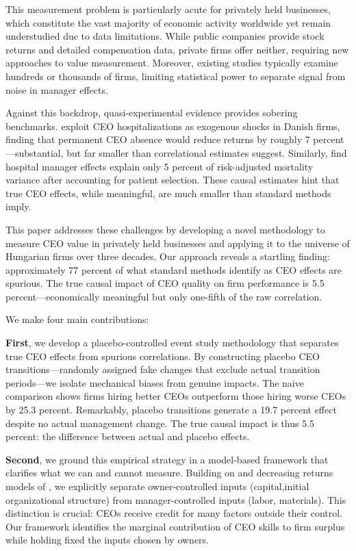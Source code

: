 \documentclass[11pt,a4paper]{article}
\begin{document}
This measurement problem is particularly acute for privately held businesses, which constitute the vast majority of economic activity worldwide yet remain understudied due to data limitations. While public companies provide stock returns and detailed compensation data, private firms offer neither, requiring new approaches to value measurement. Moreover, existing studies typically examine hundreds or thousands of firms, limiting statistical power to separate signal from noise in manager effects.

Against this backdrop, quasi-experimental evidence provides sobering benchmarks. \citet{bennedsen2020ceos} exploit CEO hospitalizations as exogenous shocks in Danish firms, finding that permanent CEO absence would reduce returns by roughly 7 percent---substantial, but far smaller than correlational estimates suggest. Similarly, \citet{chandra2016health} find hospital manager effects explain only 5 percent of risk-adjusted mortality variance after accounting for patient selection. These causal estimates hint that true CEO effects, while meaningful, are much smaller than standard methods imply.

This paper addresses these challenges by developing a novel methodology to measure CEO value in privately held businesses and applying it to the universe of Hungarian firms over three decades. Our approach reveals a startling finding: approximately 77 percent of what standard methods identify as CEO effects are spurious. The true causal impact of CEO quality on firm performance is 5.5 percent---economically meaningful but only one-fifth of the raw correlation.

We make four main contributions:

\textbf{First}, we develop a placebo-controlled event study methodology that separates true CEO effects from spurious correlations. By constructing placebo CEO transitions---randomly assigned fake changes that exclude actual transition periods---we isolate mechanical biases from genuine impacts. The naive comparison shows firms hiring better CEOs outperform those hiring worse CEOs by 25.3 percent. Remarkably, placebo transitions generate a 19.7 percent effect despite no actual management change. The true causal impact is thus 5.5 percent: the difference between actual and placebo effects.

\textbf{Second}, we ground this empirical strategy in a model-based framework that clarifies what we can and cannot measure. Building on \citet{Lucas1978-rp} and decreasing returns models of \citet{AtkesonKehoe2005JPE, McGrattan2012RED}, we explicitly separate owner-controlled inputs (capital,initial organizational structure) from manager-controlled inputs (labor, materials). This distinction is crucial: CEOs receive credit for many factors outside their control. Our framework identifies the marginal contribution of CEO skills to firm surplus while holding fixed the inputs chosen by owners.
\end{document}
